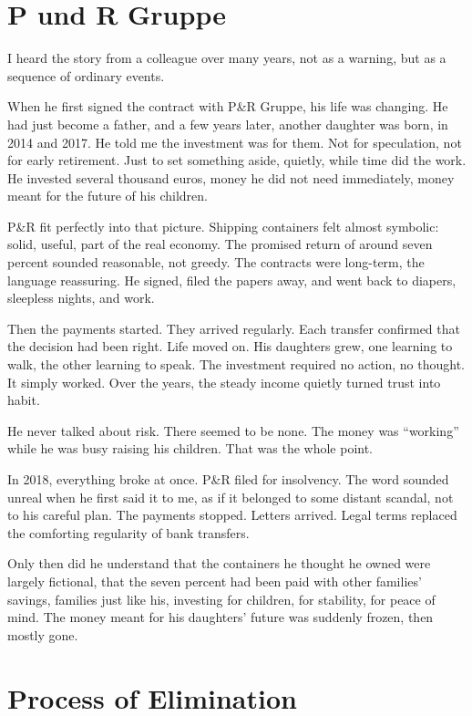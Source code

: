 \section*{P und R Gruppe}
I heard the story from a colleague over many years, not as a warning, but as a sequence of ordinary events.

When he first signed the contract with P&R Gruppe, his life was changing. He had just become a father, and a few years later, another daughter was born, in 2014 and 2017. He told me the investment was for them. Not for speculation, not for early retirement. Just to set something aside, quietly, while time did the work. He invested several thousand euros, money he did not need immediately, money meant for the future of his children.

P&R fit perfectly into that picture. Shipping containers felt almost symbolic: solid, useful, part of the real economy. The promised return of around seven percent sounded reasonable, not greedy. The contracts were long-term, the language reassuring. He signed, filed the papers away, and went back to diapers, sleepless nights, and work.

Then the payments started. They arrived regularly. Each transfer confirmed that the decision had been right. Life moved on. His daughters grew, one learning to walk, the other learning to speak. The investment required no action, no thought. It simply worked. Over the years, the steady income quietly turned trust into habit.

He never talked about risk. There seemed to be none. The money was “working” while he was busy raising his children. That was the whole point.

In 2018, everything broke at once. P&R filed for insolvency. The word sounded unreal when he first said it to me, as if it belonged to some distant scandal, not to his careful plan. The payments stopped. Letters arrived. Legal terms replaced the comforting regularity of bank transfers.

Only then did he understand that the containers he thought he owned were largely fictional, that the seven percent had been paid with other families’ savings, families just like his, investing for children, for stability, for peace of mind. The money meant for his daughters’ future was suddenly frozen, then mostly gone.

\section*{Process of Elimination}

